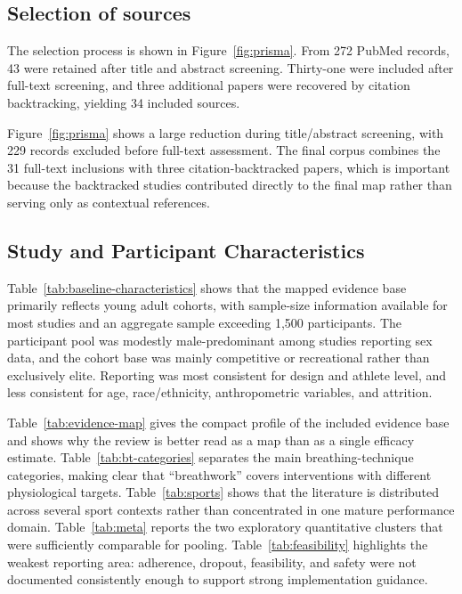 \documentclass[11pt,a4paper]{article}
\begin{document}
\subsection{Selection of sources}
The selection process is shown in Figure~\ref{fig:prisma}. From 272 PubMed records, 43 were retained after title and abstract screening. Thirty-one were included after full-text screening, and three additional papers were recovered by citation backtracking, yielding 34 included sources.



Figure~\ref{fig:prisma} shows a large reduction during title/abstract screening, with 229 records excluded before full-text assessment. The final corpus combines the 31 full-text inclusions with three citation-backtracked papers, which is important because the backtracked studies contributed directly to the final map rather than serving only as contextual references.

\subsection{Study and Participant Characteristics}


Table~\ref{tab:baseline-characteristics} shows that the mapped evidence base primarily reflects young adult cohorts, with sample-size information available for most studies and an aggregate sample exceeding 1,500 participants. The participant pool was modestly male-predominant among studies reporting sex data, and the cohort base was mainly competitive or recreational rather than exclusively elite. Reporting was most consistent for design and athlete level, and less consistent for age, race/ethnicity, anthropometric variables, and attrition.



Table~\ref{tab:evidence-map} gives the compact profile of the included evidence base and shows why the review is better read as a map than as a single efficacy estimate. Table~\ref{tab:bt-categories} separates the main breathing-technique categories, making clear that ``breathwork'' covers interventions with different physiological targets. Table~\ref{tab:sports} shows that the literature is distributed across several sport contexts rather than concentrated in one mature performance domain. Table~\ref{tab:meta} reports the two exploratory quantitative clusters that were sufficiently comparable for pooling. Table~\ref{tab:feasibility} highlights the weakest reporting area: adherence, dropout, feasibility, and safety were not documented consistently enough to support strong implementation guidance.
\end{document}
